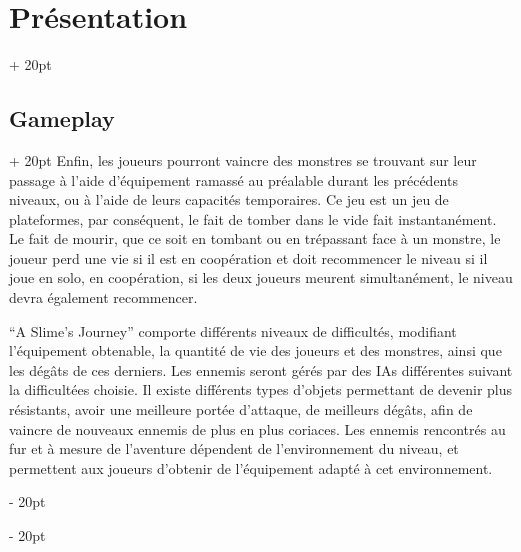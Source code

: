 \documentclass[a4paper, 12pt, twoside]{article}
\newcommand{\ind}[1][20pt]{\advance\leftskip + #1}
\newcommand{\deind}[1][20pt]{\advance\leftskip - #1}
\newenvironment{indt}[2][20pt]{#2 \par \ind[#1]}{\par \deind} %
\begin{document}
\begin{indt}{\section{Présentation}}
\begin{indt}{\subsection{Gameplay}}
           Enfin, les joueurs pourront vaincre des monstres se trouvant sur leur passage à l'aide d'équipement ramassé au préalable durant les précédents niveaux, ou à l'aide de leurs capacités temporaires. Ce jeu est un jeu de plateformes, par conséquent, le fait de tomber dans le vide fait instantanément. Le fait de mourir, que ce soit en tombant ou en trépassant face à un monstre, le joueur perd une vie si il est en coopération et doit recommencer le niveau si il joue en solo, en coopération, si les deux joueurs meurent simultanément, le niveau devra également recommencer.

           “A Slime's Journey” comporte différents niveaux de difficultés, modifiant l'équipement obtenable, la quantité de vie des joueurs et des monstres, ainsi que les dégâts de ces derniers. Les ennemis seront gérés par des IAs différentes suivant la difficultées choisie. Il existe différents types d’objets permettant de devenir plus résistants, avoir une meilleure portée d'attaque, de meilleurs dégâts, afin de vaincre de nouveaux ennemis de plus en plus coriaces. Les ennemis rencontrés au fur et à mesure de l'aventure dépendent de l'environnement du niveau, et permettent aux joueurs d'obtenir de l'équipement adapté à cet environnement.    
        \end{indt}
    \end{indt}

    \newpage
\end{document}
